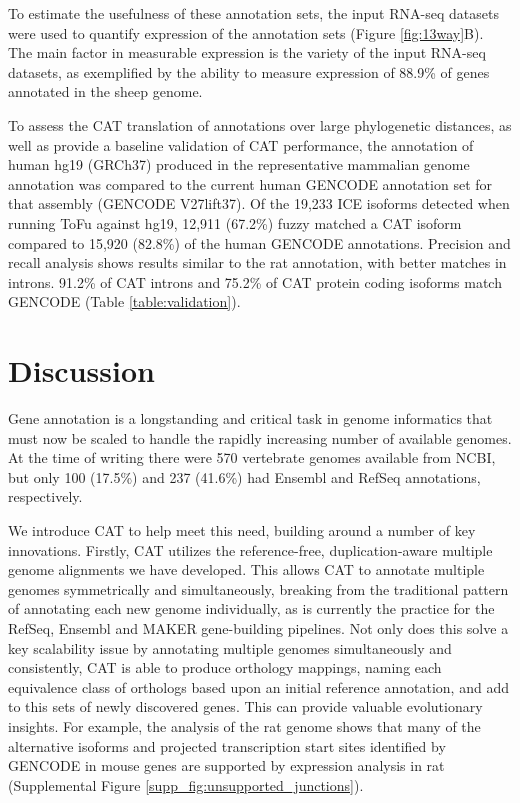\documentclass[fleqn,10pt]{wlscirep}
\begin{document}
To estimate the usefulness of these annotation sets, the input RNA-seq datasets were used to quantify expression of the annotation sets (Figure \ref{fig:13way}B). The main factor in measurable expression is the variety of the input RNA-seq datasets, as exemplified by the ability to measure expression of 88.9\% of genes annotated in the sheep genome. 

To assess the CAT translation of annotations over large phylogenetic distances, as well as provide a baseline validation of CAT performance, the annotation of human hg19 (GRCh37) produced in the representative mammalian genome annotation was compared to the current human GENCODE annotation set for that assembly (GENCODE V27lift37). Of the 19,233 ICE isoforms detected when running ToFu \cite{gordon2015widespread} against hg19, 12,911 (67.2\%) fuzzy matched a CAT isoform compared to 15,920 (82.8\%) of the human GENCODE annotations. Precision and recall analysis shows results similar to the rat annotation, with better matches in introns. 91.2\% of CAT introns and 75.2\% of CAT protein coding isoforms match GENCODE (Table \ref{table:validation}).

\section*{Discussion}

Gene annotation is a longstanding and critical task in genome informatics that must now be scaled to handle the rapidly increasing number of available genomes. At the time of writing there were 570 vertebrate genomes available from NCBI, but only 100 (17.5\%) and 237 (41.6\%) had Ensembl and RefSeq annotations, respectively.

We introduce CAT to help meet this need, building around a number of key innovations. 
Firstly, CAT utilizes the reference-free, duplication-aware multiple genome alignments we have developed. This allows CAT to annotate multiple genomes symmetrically and simultaneously, breaking from the traditional pattern of annotating each new genome individually, as is currently the practice for the RefSeq, Ensembl and MAKER gene-building pipelines.
Not only does this solve a key scalability issue 
by annotating multiple genomes simultaneously and consistently, CAT is able to produce orthology mappings, naming each equivalence class of orthologs based upon an initial reference annotation, and add to this sets of newly discovered genes. This can provide valuable evolutionary insights. For example, the analysis of the rat genome shows that many of the alternative isoforms and projected transcription start sites identified by GENCODE in mouse genes are supported by expression analysis in rat (Supplemental Figure \ref{supp_fig:unsupported_junctions}).
\end{document}
